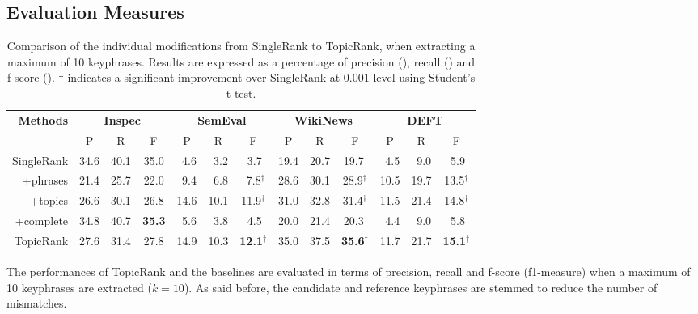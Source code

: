   \subsection{Evaluation Measures}
  \label{subsec:measures}
    \begin{table}
      \centering
      \begin{tabular}{@{ }rcccccccccccc@{ }}
        \toprule
        \multirow{2}{*}[-2pt]{\textbf{Methods}} & \multicolumn{3}{c}{\textbf{Inspec}} & \multicolumn{3}{c}{\textbf{SemEval}} & \multicolumn{3}{c}{\textbf{WikiNews}} & \multicolumn{3}{c}{\textbf{DEFT}}\\
        \cmidrule(lr){2-4}\cmidrule(lr){5-7}\cmidrule(lr){8-10}\cmidrule(l){11-13}
        & P & R & F & P & R & F & P & R & F & P & R & F\\
        \midrule
        SingleRank & 34.6 & 40.1 & 35.0 & $~~$4.6 & $~~$3.2 & $~~$3.7$^{~}$ & 19.4 & 20.7 & 19.7$^{~}$ & $~~$4.5 & $~~$9.0 & $~~$5.9$^{~}$\\
        +phrases & 21.4 & 25.7 & 22.0 & $~~$9.4 & $~~$6.8 & $~~$7.8$^\dagger$ & 28.6 & 30.1 & 28.9$^\dagger$ & 10.5 & 19.7 & 13.5$^\dagger$\\
        +topics & 26.6 & 30.1 & 26.8 & 14.6 & 10.1 & 11.9$^\dagger$ & 31.0 & 32.8 & 31.4$^\dagger$ & 11.5 & 21.4 & 14.8$^\dagger$\\
        +complete & 34.8 & 40.7 & \textbf{35.3} & $~~$5.6 & $~~$3.8 & $~~$4.5$^{~}$ & 20.0 & 21.4 & 20.3${~}$ & $~~$4.4 & $~~$9.0 & $~~$5.8$^{~}$\\
        TopicRank & 27.6 & 31.4 & 27.8  & 14.9 & 10.3 & \textbf{12.1}$^\dagger$ & 35.0 & 37.5 & \textbf{35.6}$^\dagger$ & 11.7 & 21.7 & \textbf{15.1}$^\dagger$\\
        \bottomrule
      \end{tabular}
      \caption{Comparison of the individual modifications from SingleRank to
               TopicRank, when extracting a maximum of 10 keyphrases. Results
               are expressed as a percentage of precision (), recall
               () and f-score (). $\dagger$ indicates a
               significant improvement over SingleRank at 0.001 level using
               Student's t-test.
               \label{tab:singlerank_improvements}}
    \end{table}

    The performances of TopicRank and the baselines are evaluated in terms of
    precision, recall and f-score (f1-measure) when a maximum of 10 keyphrases
    are extracted ($k = 10$). As said before, the candidate and reference
    keyphrases are stemmed to reduce the number of mismatches.

